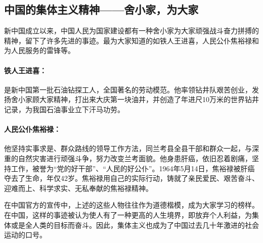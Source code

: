 \subsection{中国的集体主义精神——舍小家，为大家}
\par
新中国成立以来，中国人民为国家建设都有一种舍小家为大家顽强战斗奋力拼搏的精神，留下了许多先进的事迹。最为大家知道的如铁人王进喜，人民公仆焦裕禄和为人民服务的雷锋等。

\paragraph{铁人王进喜：}
是新中国第一批石油钻探工人，全国著名的劳动模范。他率领钻井队艰苦创业，发扬舍小家顾大家精神，打出来大庆第一块油井，并创造了年进尺10万米的世界钻井记录，为我国石油事业立下汗马功劳。
\paragraph{人民公仆焦裕禄：}
他坚持实事求是、群众路线的领导工作方法，同兰考县全县干部和群众一起，与深重的自然灾害进行顽强斗争，努力改变兰考面貌。他身患肝癌，依旧忍着剧痛，坚持工作，被誉为“党的好干部”、“人民的好公仆”。1964年5月14日，焦裕禄被肝癌夺去了生命，年仅42岁。焦裕禄用自己的实际行动，铸就了亲民爱民、艰苦奋斗、迎难而上、科学求实、无私奉献的焦裕禄精神。
\vspace{1em}
\par
在中国官方的宣传中，上述的这些人物往往作为道德楷模，成为大家学习的榜样。在中国，这样的事迹被认为使人有了一种更高的人生境界，即放弃个人利益，为集体或是全人类的目标而奋斗。因此，集体主义也成为了中国过去几十年激进的社会运动的口号。

